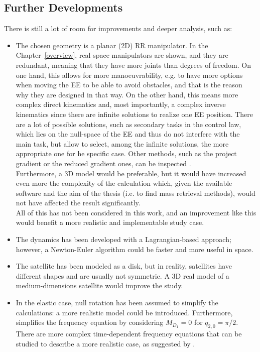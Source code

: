 \documentclass[a4paper,12pt,oneside]{report}
\begin{document}
\subsection{Further Developments}
There is still a lot of room for improvements and deeper analysis, such as:
\begin{itemize}
  \item The chosen geometry is a planar (2D) RR manipulator. In the Chapter~\ref{overview}, real space manipulators are shown, and they are redundant, meaning that they have more joints than degrees of freedom. On one hand, this allows for more manoeuvrability, e.g. to have more options when moving the EE to be able to avoid obstacles, and that is the reason why they are designed in that way. On the other hand, this means more complex direct kinematics and, most importantly, a complex inverse kinematics since there are infinite solutions to realize one EE position. There are a lot of possible solutions, such as secondary tasks in the control law, which lies on the null-space of the EE and thus do not interfere with the main task, but allow to select, among the infinite solutions, the more appropriate one for he specific case. Other methods, such as the project gradient or the reduced gradient ones, can be inspected \cite{twentysix}.\\
    Furthermore, a 3D model would be preferable, but it would have increased even more the complexity of the calculation which, given the available software and the aim of the thesis (i.e. to find mass retrieval methods), would not have affected the result significantly.\\
    All of this has not been considered in this work, and an improvement like this would benefit a more realistic and implementable study case.
  \item The dynamics has been developed with a Lagrangian-based approach; however, a Newton-Euler algorithm could be faster and more useful in space.
  \item The satellite has been modeled as a disk, but in reality, satellites have different shapes and are usually not symmetric. A 3D real model of a medium-dimensions satellite would improve the study.
  \item In the elastic case, null rotation has been assumed to simplify the calculations: a more realistic model could be introduced. Furthermore, \cite{eighteen} simplifies the frequency equation by considering $M_{D_1}=0$ for $q_{2,0}=\pi/2$. There are more complex time-dependent frequency equations that can be studied to describe a more realistic case, as suggested by \cite{seventeen}.\\

\end{itemize}
\end{document}
